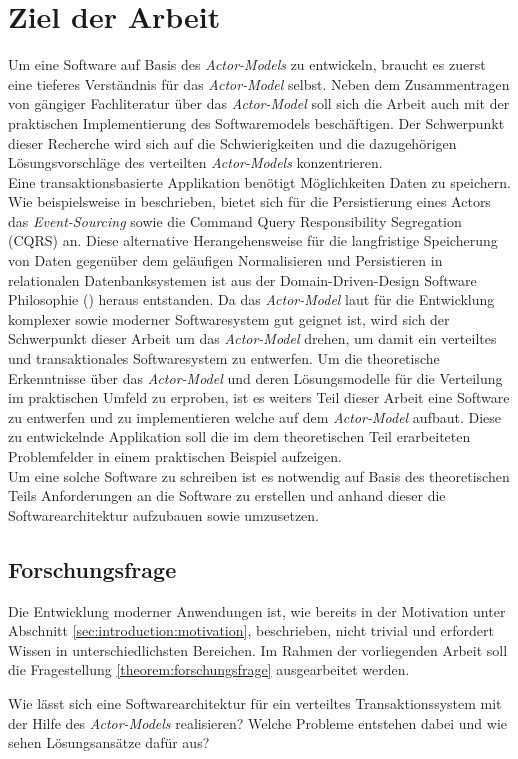 \section{Ziel der Arbeit}\label{sec:introduction:workGoal}
Um eine Software auf Basis des \textit{Actor-Models} zu entwickeln, braucht es zuerst eine tieferes Verständnis für das \textit{Actor-Model}  selbst.  Neben dem Zusammentragen  von gängiger Fachliteratur über das \textit{Actor-Model} soll sich die Arbeit auch mit der praktischen Implementierung des Softwaremodels beschäftigen. Der Schwerpunkt dieser Recherche wird sich auf die Schwierigkeiten und die dazugehörigen Lösungsvorschläge des verteilten \textit{Actor-Models}  konzentrieren. \\
Eine transaktionsbasierte Applikation benötigt Möglichkeiten Daten zu speichern. Wie beispielsweise in \cite{Vernon2015ReactiveAkka} beschrieben, bietet sich für die Persistierung eines Actors das \textit{Event-Sourcing} sowie die {Command Query Responsibility Segregation (CQRS)} an. Diese alternative Herangehensweise für die langfristige Speicherung von Daten gegenüber dem geläufigen Normalisieren und Persistieren in relationalen Datenbanksystemen ist aus der Domain-Driven-Design Software Philosophie (\cite{Evans2004Domain-drivenSoftware}) heraus  entstanden. Da das \textit{Actor-Model} laut \cite{Vernon2015ReactiveAkka} für die Entwicklung komplexer sowie moderner Softwaresystem gut geignet ist, wird sich der Schwerpunkt dieser Arbeit um das \textit{Actor-Model} drehen, um damit ein verteiltes und transaktionales Softwaresystem zu entwerfen.
Um die theoretische Erkenntnisse über das \textit{Actor-Model}  und deren Lösungsmodelle für die Verteilung im praktischen Umfeld zu erproben, ist es weiters Teil dieser Arbeit eine Software zu entwerfen und zu implementieren welche auf dem \textit{Actor-Model} aufbaut. Diese zu entwickelnde Applikation soll die im dem theoretischen Teil erarbeiteten Problemfelder in einem praktischen Beispiel aufzeigen. \\
Um eine solche Software zu schreiben ist es notwendig auf Basis des theoretischen Teils Anforderungen an die Software zu erstellen und anhand dieser die Softwarearchitektur aufzubauen sowie umzusetzen. 

\subsection{Forschungsfrage}\label{sec:introduction:forschungsfrage}
Die Entwicklung moderner Anwendungen ist, wie bereits in der Motivation unter Abschnitt \ref{sec:introduction:motivation}, beschrieben, nicht trivial und erfordert Wissen in unterschiedlichsten Bereichen. Im Rahmen der vorliegenden Arbeit soll die Fragestellung \ref{theorem:forschungsfrage} ausgearbeitet werden. 
\begin{Theorem}
\label{theorem:forschungsfrage}
Wie lässt sich eine Softwarearchitektur für ein verteiltes Transaktionssystem mit der Hilfe des \textit{Actor-Models} realisieren? Welche Probleme entstehen dabei und wie sehen Lösungsansätze dafür aus?
\end{Theorem}
